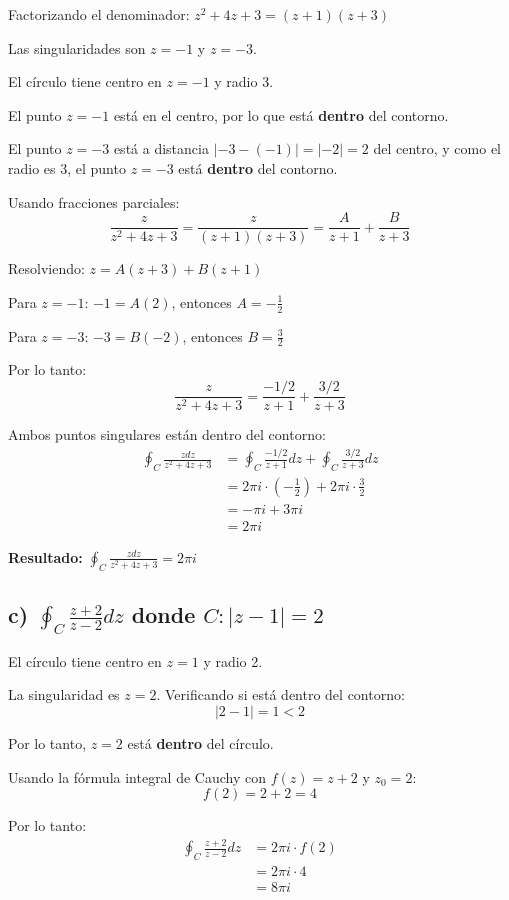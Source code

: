 \documentclass{article}
\begin{document}
Factorizando el denominador: $z^2 + 4z + 3 = (z + 1)(z + 3)$

Las singularidades son $z = -1$ y $z = -3$.

El círculo tiene centro en $z = -1$ y radio 3.

El punto $z = -1$ está en el centro, por lo que está \textbf{dentro} del contorno.

El punto $z = -3$ está a distancia $|-3 - (-1)| = |-2| = 2$ del centro, y como el radio es 3, el punto $z = -3$ está \textbf{dentro} del contorno.

Usando fracciones parciales:
$$\frac{z}{z^2 + 4z + 3} = \frac{z}{(z + 1)(z + 3)} = \frac{A}{z + 1} + \frac{B}{z + 3}$$

Resolviendo: $z = A(z + 3) + B(z + 1)$

Para $z = -1$: $-1 = A(2)$, entonces $A = -\frac{1}{2}$

Para $z = -3$: $-3 = B(-2)$, entonces $B = \frac{3}{2}$

Por lo tanto:
$$\frac{z}{z^2 + 4z + 3} = \frac{-1/2}{z + 1} + \frac{3/2}{z + 3}$$

Ambos puntos singulares están dentro del contorno:
\begin{align*}
\oint_C \frac{z dz}{z^2 + 4z + 3} &= \oint_C \frac{-1/2}{z + 1} dz + \oint_C \frac{3/2}{z + 3} dz \\
                                   &= 2\pi i \cdot \left(-\frac{1}{2}\right) + 2\pi i \cdot \frac{3}{2} \\
                                   &= -\pi i + 3\pi i \\
                                   &= 2\pi i
\end{align*}

\textbf{Resultado:} $\oint_C \frac{z dz}{z^2 + 4z + 3} = 2\pi i$

\subsection*{c) $\oint_C \frac{z + 2}{z - 2} dz$ donde $C: |z - 1| = 2$}

El círculo tiene centro en $z = 1$ y radio 2.

La singularidad es $z = 2$. Verificando si está dentro del contorno:
$$|2 - 1| = 1 < 2$$

Por lo tanto, $z = 2$ está \textbf{dentro} del círculo.

Usando la fórmula integral de Cauchy con $f(z) = z + 2$ y $z_0 = 2$:
$$f(2) = 2 + 2 = 4$$

Por lo tanto:
\begin{align*}
\oint_C \frac{z + 2}{z - 2} dz &= 2\pi i \cdot f(2) \\
                                &= 2\pi i \cdot 4 \\
                                &= 8\pi i
\end{align*}
\end{document}
